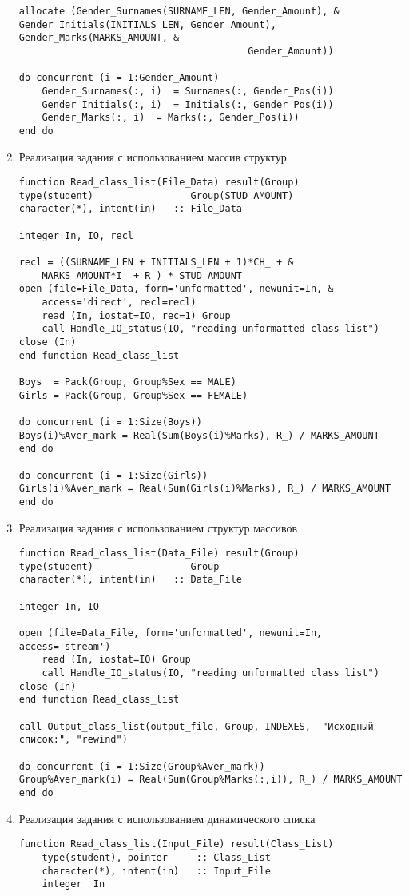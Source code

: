 \documentclass[a4paper,12pt]{extreport}
\begin{document}
\begin{enumerate}
\begin{verbatim}
allocate (Gender_Surnames(SURNAME_LEN, Gender_Amount), &
Gender_Initials(INITIALS_LEN, Gender_Amount), Gender_Marks(MARKS_AMOUNT, &
                                        Gender_Amount))

do concurrent (i = 1:Gender_Amount)
    Gender_Surnames(:, i)  = Surnames(:, Gender_Pos(i))
    Gender_Initials(:, i)  = Initials(:, Gender_Pos(i))
    Gender_Marks(:, i)  = Marks(:, Gender_Pos(i))
end do
\end{verbatim}
         
\item Реализация задания с использованием массив структур
\begin{verbatim}
function Read_class_list(File_Data) result(Group)
type(student)                 Group(STUD_AMOUNT)
character(*), intent(in)   :: File_Data

integer In, IO, recl

recl = ((SURNAME_LEN + INITIALS_LEN + 1)*CH_ + &
    MARKS_AMOUNT*I_ + R_) * STUD_AMOUNT
open (file=File_Data, form='unformatted', newunit=In, &
    access='direct', recl=recl)
    read (In, iostat=IO, rec=1) Group
    call Handle_IO_status(IO, "reading unformatted class list")
close (In)
end function Read_class_list

Boys  = Pack(Group, Group%Sex == MALE)
Girls = Pack(Group, Group%Sex == FEMALE)

do concurrent (i = 1:Size(Boys))
Boys(i)%Aver_mark = Real(Sum(Boys(i)%Marks), R_) / MARKS_AMOUNT
end do

do concurrent (i = 1:Size(Girls))
Girls(i)%Aver_mark = Real(Sum(Girls(i)%Marks), R_) / MARKS_AMOUNT
end do
\end{verbatim}

    \item Реализация задания с использованием структур массивов
\begin{verbatim}
function Read_class_list(Data_File) result(Group)
type(student)                 Group
character(*), intent(in)   :: Data_File

integer In, IO

open (file=Data_File, form='unformatted', newunit=In, access='stream')
    read (In, iostat=IO) Group
    call Handle_IO_status(IO, "reading unformatted class list")
close (In)
end function Read_class_list

call Output_class_list(output_file, Group, INDEXES,  "Исходный список:", "rewind")

do concurrent (i = 1:Size(Group%Aver_mark))
Group%Aver_mark(i) = Real(Sum(Group%Marks(:,i)), R_) / MARKS_AMOUNT
end do
\end{verbatim}
    \item Реализация задания с использованием динамического списка
\begin{verbatim}
function Read_class_list(Input_File) result(Class_List)
    type(student), pointer     :: Class_List
    character(*), intent(in)   :: Input_File
    integer  In


\end{verbatim}
\end{enumerate}
\end{document}
